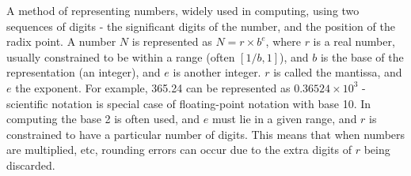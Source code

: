 A method of representing numbers, widely used in computing, using
  two sequences of digits - the significant digits of the number, and
  the position of the radix point.  
  A number $N$ is represented as $N = r \times b^e$, where $r$ is a real
  number, usually constrained to be within a range (often $[1/b, 1]$),
  and $b$ is the base of the representation (an integer), and $e$ is
  another integer. $r$ is called the mantissa, and $e$ the exponent.  
  For example, 365.24 can be represented as $0.36524 \times 10^3$ 
  - scientific notation is special case of
  floating-point notation with base 10.  
  In computing the base 2 is often used, and $e$ must lie in a given
  range, and $r$ is constrained to have a particular number of
  digits. This means that when numbers are multiplied, etc, rounding
  errors can occur due to the extra digits of $r$ being discarded.